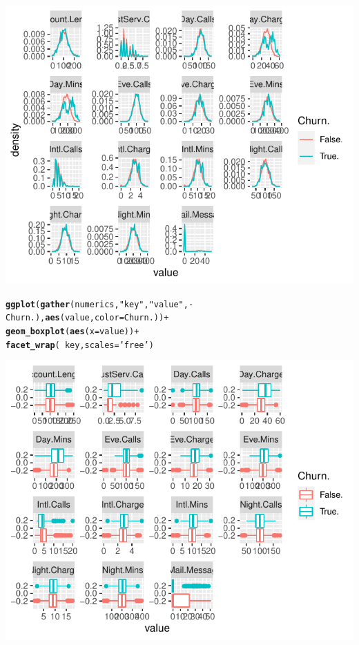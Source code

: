 \documentclass{article}\usepackage[]{graphicx}\usepackage[]{color}
\makeatletter
\def\maxwidth{ %
  \ifdim\Gin@nat@width>\linewidth
    \linewidth
  \else
    \Gin@nat@width
  \fi
}
\newcommand{\hlstr}[1]{\textcolor[rgb]{0.192,0.494,0.8}{#1}}%
\newcommand{\hlopt}[1]{\textcolor[rgb]{0,0,0}{#1}}%
\newcommand{\hlstd}[1]{\textcolor[rgb]{0.345,0.345,0.345}{#1}}%
\newcommand{\hlkwc}[1]{\textcolor[rgb]{0.333,0.667,0.333}{#1}}%
\newcommand{\hlkwd}[1]{\textcolor[rgb]{0.737,0.353,0.396}{\textbf{#1}}}%
\newenvironment{kframe}{%
 \def\at@end@of@kframe{}%
 \ifinner\ifhmode%
  \def\at@end@of@kframe{\end{minipage}}%
  \begin{minipage}{\columnwidth}%
 \fi\fi%
 \def\FrameCommand##1{\hskip\@totalleftmargin \hskip-\fboxsep
 \colorbox{shadecolor}{##1}\hskip-\fboxsep
     \hskip-\linewidth \hskip-\@totalleftmargin \hskip\columnwidth}%
 \MakeFramed {\advance\hsize-\width
   \@totalleftmargin\z@ \linewidth\hsize
   \@setminipage}}%
 {\par\unskip\endMakeFramed%
 \at@end@of@kframe}
\newenvironment{knitrout}{}{} %
\makeatother
\begin{document}
\begin{description}
\begin{knitrout}
{\centering \includegraphics[width=\maxwidth]{figure/Overviews_plots_grouped-2} 

}


\begin{kframe}\begin{alltt}
\hlkwd{ggplot}\hlstd{(}\hlkwd{gather}\hlstd{(numerics,} \hlstr{"key"}\hlstd{,} \hlstr{"value"}\hlstd{,} \hlopt{-}\hlstd{Churn.),} \hlkwd{aes}\hlstd{(value,} \hlkwc{color}\hlstd{=Churn.))} \hlopt{+}
  \hlkwd{geom_boxplot}\hlstd{(}\hlkwd{aes}\hlstd{(}\hlkwc{x}\hlstd{=value))} \hlopt{+}
  \hlkwd{facet_wrap}\hlstd{(}\hlopt{~}\hlstd{key,} \hlkwc{scales}\hlstd{=}\hlstr{'free'}\hlstd{)}
\end{alltt}
\end{kframe}

{\centering \includegraphics[width=\maxwidth]{figure/Overviews_plots_grouped-3} 

}
\end{knitrout}
\end{description}
\end{document}
